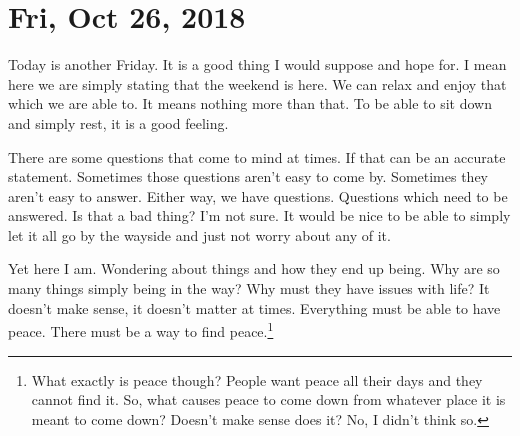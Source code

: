 \section{Fri, Oct 26, 2018}

Today is another Friday. It is a good thing I would suppose and hope for. I mean here
we are simply stating that the weekend is here. We can relax and enjoy that which we
are able to. It means nothing more than that. To be able to sit down and simply rest,
it is a good feeling.

There are some questions that come to mind at times. If that can be an accurate
statement. Sometimes those questions aren't easy to come by. Sometimes they aren't
easy to answer. Either way, we have questions. Questions which need to be answered.
Is that a bad thing? I'm not sure. It would be nice to be able to simply let it all
go by the wayside and just not worry about any of it.

Yet here I am. Wondering about things and how they end up being. Why are so many
things simply being in the way? Why must they have issues with life? It doesn't make
sense, it doesn't matter at times. Everything must be able to have peace. There must
be a way to find peace.\footnote{What exactly is peace though? People want peace all 
their days and they cannot find it. So, what causes peace to come down from whatever
place it is meant to come down? Doesn't make sense does it? No, I didn't think so.}
